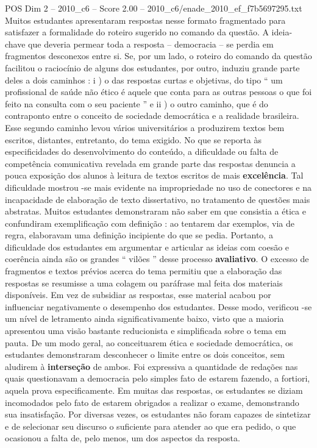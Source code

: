 \begin{textsample}{POS Dim 2 – 2010\_c6 – Score 2.00 – 2010\_c6/enade\_2010\_ef\_f7b5697295.txt}
Muitos estudantes apresentaram respostas nesse formato fragmentado para satisfazer a formalidade do roteiro sugerido no comando da questão.
A ideia-chave que deveria permear toda a resposta – democracia – se perdia em fragmentos desconexos entre si.
Se, por um lado, o roteiro do comando da questão facilitou o raciocínio de alguns dos estudantes, por outro, induziu grande parte deles a dois caminhos : i ) o das respostas curtas e objetivas, do tipo “ um profissional de saúde não ético é aquele que conta para as outras pessoas o que foi feito na consulta com o seu paciente ” e ii ) o outro caminho, que é do contraponto entre o conceito de sociedade democrática e a realidade brasileira.
Esse segundo caminho levou vários universitários a produzirem textos bem escritos, distantes, entretanto, do tema exigido.
No que se reporta às especificidades do desenvolvimento do conteúdo, a dificuldade ou falta de competência comunicativa revelada em grande parte das respostas denuncia a pouca exposição dos alunos à leitura de textos escritos de mais \textbf{excelência}.
Tal dificuldade mostrou -se mais evidente na impropriedade no uso de conectores e na incapacidade de elaboração de texto dissertativo, no tratamento de questões mais abstratas.
Muitos estudantes demonstraram não saber em que consistia a ética e confundiram exemplificação com definição : ao tentarem dar exemplos, via de regra, elaboravam uma definição incipiente do que se pedia.
Portanto, a dificuldade dos estudantes em argumentar e articular as ideias com coesão e coerência ainda são os grandes “ vilões ” desse processo \textbf{avaliativo}.
O excesso de fragmentos e textos prévios acerca do tema permitiu que a elaboração das respostas se resumisse a uma colagem ou paráfrase mal feita dos materiais disponíveis.
Em vez de subsidiar as respostas, esse material acabou por influenciar negativamente o desempenho dos estudantes.
Desse modo, verificou -se um nível de letramento ainda significativamente baixo, visto que a maioria apresentou uma visão bastante reducionista e simplificada sobre o tema em pauta.
De um modo geral, ao conceituarem ética e sociedade democrática, os estudantes demonstraram desconhecer o limite entre os dois conceitos, sem aludirem à \textbf{interseção} de ambos.
Foi expressiva a quantidade de redações nas quais questionavam a democracia pelo simples fato de estarem fazendo, a fortiori, aquela prova especificamente.
Em muitas das respostas, os estudantes se diziam incomodados pelo fato de estarem obrigados a realizar o exame, demonstrando sua insatisfação.
Por diversas vezes, os estudantes não foram capazes de sintetizar e de selecionar seu discurso o suficiente para atender ao que era pedido, o que ocasionou a falta de, pelo menos, um dos aspectos da resposta.

\end{textsample}
